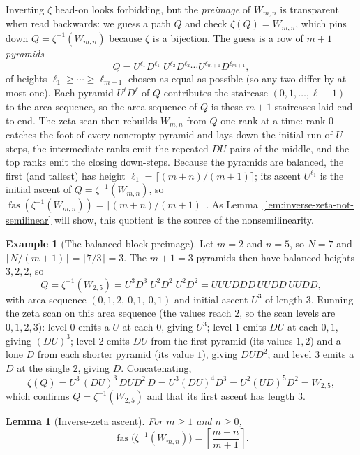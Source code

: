 \documentclass[11pt]{article}
\newtheorem{lemma}[theorem]{Lemma}
\theoremstyle{definition}
\newtheorem{example}[theorem]{Example}
\newcommand{\fas}{\operatorname{fas}}
\begin{document}
Inverting $\zeta$ head-on looks forbidding, but the \emph{preimage} of $W_{m,n}$
is transparent when read backwards: we guess a path $Q$ and check
$\zeta(Q)=W_{m,n}$, which pins down $Q=\zeta^{-1}(W_{m,n})$ because $\zeta$ is a
bijection.  The guess is a row of $m+1$ \emph{pyramids}
\[
   Q=U^{\ell_1}D^{\ell_1}\;U^{\ell_2}D^{\ell_2}\cdots U^{\ell_{m+1}}D^{\ell_{m+1}},
\]
of heights $\ell_1\ge\cdots\ge\ell_{m+1}$ chosen as equal as possible (so any two
differ by at most one).  Each pyramid $U^{\ell}D^{\ell}$ of $Q$ contributes the
staircase $(0,1,\ldots,\ell-1)$ to the area sequence, so the area sequence of $Q$
is these $m+1$ staircases laid end to end.  The zeta scan then rebuilds $W_{m,n}$
from $Q$ one rank at a time: rank $0$ catches the foot of every nonempty
pyramid and lays down the initial run of $U$-steps, the intermediate ranks emit
the repeated $DU$ pairs of the middle, and the top ranks emit the closing
down-steps.  Because the pyramids
are balanced, the first (and tallest) has height
$\ell_1=\lceil(m+n)/(m+1)\rceil$; its ascent $U^{\ell_1}$ is the initial ascent of
$Q=\zeta^{-1}(W_{m,n})$, so $\fas(\zeta^{-1}(W_{m,n}))=\lceil(m+n)/(m+1)\rceil$.
As Lemma~\ref{lem:inverse-zeta-not-semilinear} will show, this quotient is the
source of the nonsemilinearity.

\begin{example}[The balanced-block preimage]
Let $m=2$ and $n=5$, so $N=7$ and $\lceil N/(m+1)\rceil=\lceil 7/3\rceil=3$.  The
$m+1=3$ pyramids then have balanced heights $3,2,2$, so
\[
   Q=\zeta^{-1}(W_{2,5})=U^3D^3\;U^2D^2\;U^2D^2
   =UUUDDD\,UUDD\,UUDD,
\]
with area sequence $(0,1,2,\ 0,1,\ 0,1)$ and initial ascent $U^3$ of length $3$.
Running the zeta scan on this area sequence (the values reach $2$, so the scan
levels are $0,1,2,3$): level $0$ emits a $U$ at each $0$, giving $U^3$; level $1$ emits
$DU$ at each $0,1$, giving $(DU)^3$; level $2$ emits $DU$ from the first pyramid
(its values $1,2$) and a lone $D$ from each shorter pyramid (its value $1$),
giving $DUD^2$; and level $3$ emits a $D$ at the single $2$, giving $D$.
Concatenating,
\[
   \zeta(Q)=U^3\,(DU)^3\,DUD^2\,D=U^3(DU)^4D^3=U^2(UD)^5D^2=W_{2,5},
\]
which confirms $Q=\zeta^{-1}(W_{2,5})$ and that its first ascent has length $3$.
\end{example}

\begin{lemma}[Inverse-zeta ascent]
\label{lem:inverse-zeta-fas}
For $m\ge 1$ and $n\ge 0$,
\[
   \fas\bigl(\zeta^{-1}(W_{m,n})\bigr)=\left\lceil\frac{m+n}{m+1}\right\rceil.
\]
\end{lemma}
\end{document}
